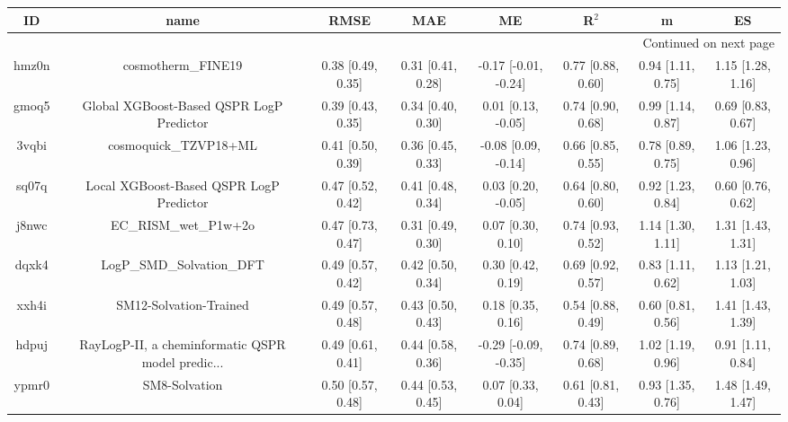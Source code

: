 \documentclass{article}
\begin{document}
\begin{center}
\begin{longtable}{|cccccccc|}
\toprule
    ID &                                               name &               RMSE &                MAE &                    ME &              R$^2$ &                     m &                    ES \\
\midrule
\endhead
\midrule
\multicolumn{8}{r}{{Continued on next page}} \\
\midrule
\endfoot

\bottomrule
\endlastfoot
 hmz0n &                                 cosmotherm\_FINE19 &  0.38 [0.49, 0.35] &  0.31 [0.41, 0.28] &  -0.17 [-0.01, -0.24] &  0.77 [0.88, 0.60] &     0.94 [1.11, 0.75] &     1.15 [1.28, 1.16] \\
 gmoq5 &           Global XGBoost-Based QSPR LogP Predictor &  0.39 [0.43, 0.35] &  0.34 [0.40, 0.30] &    0.01 [0.13, -0.05] &  0.74 [0.90, 0.68] &     0.99 [1.14, 0.87] &     0.69 [0.83, 0.67] \\
 3vqbi &                              cosmoquick\_TZVP18+ML &  0.41 [0.50, 0.39] &  0.36 [0.45, 0.33] &   -0.08 [0.09, -0.14] &  0.66 [0.85, 0.55] &     0.78 [0.89, 0.75] &     1.06 [1.23, 0.96] \\
 sq07q &            Local XGBoost-Based QSPR LogP Predictor &  0.47 [0.52, 0.42] &  0.41 [0.48, 0.34] &    0.03 [0.20, -0.05] &  0.64 [0.80, 0.60] &     0.92 [1.23, 0.84] &     0.60 [0.76, 0.62] \\
 j8nwc &                              EC\_RISM\_wet\_P1w+2o &  0.47 [0.73, 0.47] &  0.31 [0.49, 0.30] &     0.07 [0.30, 0.10] &  0.74 [0.93, 0.52] &     1.14 [1.30, 1.11] &     1.31 [1.43, 1.31] \\
 dqxk4 &                          LogP\_SMD\_Solvation\_DFT &  0.49 [0.57, 0.42] &  0.42 [0.50, 0.34] &     0.30 [0.42, 0.19] &  0.69 [0.92, 0.57] &     0.83 [1.11, 0.62] &     1.13 [1.21, 1.03] \\
 xxh4i &                             SM12-Solvation-Trained &  0.49 [0.57, 0.48] &  0.43 [0.50, 0.43] &     0.18 [0.35, 0.16] &  0.54 [0.88, 0.49] &     0.60 [0.81, 0.56] &     1.41 [1.43, 1.39] \\
 hdpuj &  RayLogP-II, a cheminformatic QSPR model predic... &  0.49 [0.61, 0.41] &  0.44 [0.58, 0.36] &  -0.29 [-0.09, -0.35] &  0.74 [0.89, 0.68] &     1.02 [1.19, 0.96] &     0.91 [1.11, 0.84] \\
 ypmr0 &                                      SM8-Solvation &  0.50 [0.57, 0.48] &  0.44 [0.53, 0.45] &     0.07 [0.33, 0.04] &  0.61 [0.81, 0.43] &     0.93 [1.35, 0.76] &     1.48 [1.49, 1.47] \\

\end{longtable}
\end{center}
\end{document}
